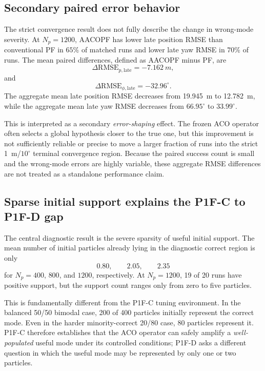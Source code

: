 \subsection{Secondary paired error behavior}
The strict convergence result does not fully describe the change in wrong-mode severity. At $N_p=1200$, AACOPF has lower late position RMSE than conventional PF in $65\%$ of matched runs and lower late yaw RMSE in $70\%$ of runs. The mean paired differences, defined as AACOPF minus PF, are
\begin{equation}
    \Delta\mathrm{RMSE}_{p,\mathrm{late}}=-\SI{7.162}{m},
\end{equation}
and
\begin{equation}
    \Delta\mathrm{RMSE}_{\phi,\mathrm{late}}=-32.96^\circ.
\end{equation}
The aggregate mean late position RMSE decreases from \SI{19.945}{m} to \SI{12.782}{m}, while the aggregate mean late yaw RMSE decreases from $66.95^\circ$ to $33.99^\circ$.

This is interpreted as a secondary \emph{error-shaping} effect. The frozen ACO operator often selects a global hypothesis closer to the true one, but this improvement is not sufficiently reliable or precise to move a larger fraction of runs into the strict \SI{1}{m}/$10^\circ$ terminal convergence region. Because the paired success count is small and the wrong-mode errors are highly variable, these aggregate RMSE differences are not treated as a standalone performance claim.

\subsection{Sparse initial support explains the P1F-C to P1F-D gap}
The central diagnostic result is the severe sparsity of useful initial support. The mean number of initial particles already lying in the diagnostic correct region is only
\begin{equation}
    0.80,\qquad 2.05,\qquad 2.35
\end{equation}
for $N_p=400$, $800$, and $1200$, respectively. At $N_p=1200$, 19 of 20 runs have positive support, but the support count ranges only from zero to five particles.

This is fundamentally different from the P1F-C tuning environment. In the balanced 50/50 bimodal case, 200 of 400 particles initially represent the correct mode. Even in the harder minority-correct 20/80 case, 80 particles represent it. P1F-C therefore establishes that the ACO operator can safely amplify a \emph{well-populated} useful mode under its controlled conditions; P1F-D asks a different question in which the useful mode may be represented by only one or two particles.

